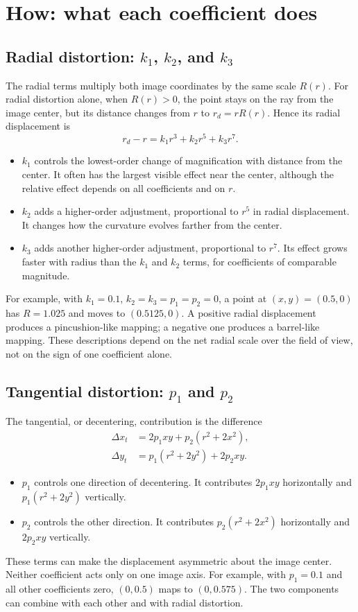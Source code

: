 \documentclass[11pt,a4paper]{article}
\begin{document}
\section{How: what each coefficient does}
\subsection{Radial distortion: $k_1$, $k_2$, and $k_3$}
The radial terms multiply both image coordinates by the same scale $R(r)$.
For radial distortion alone, when $R(r)>0$, the point stays on the ray from
the image center, but its distance changes from $r$ to $r_d=rR(r)$. Hence its
radial displacement is
\begin{equation}
  r_d-r=k_1r^3+k_2r^5+k_3r^7.
\end{equation}
\begin{itemize}
  \item $k_1$ controls the lowest-order change of magnification with distance
  from the center. It often has the largest visible effect near the center,
  although the relative effect depends on all coefficients and on $r$.
  \item $k_2$ adds a higher-order adjustment, proportional to $r^5$ in
  radial displacement. It changes how the curvature evolves farther from the
  center.
  \item $k_3$ adds another higher-order adjustment, proportional to $r^7$.
  Its effect grows faster with radius than the $k_1$ and $k_2$ terms, for
  coefficients of comparable magnitude.
\end{itemize}
For example, with $k_1=0.1$, $k_2=k_3=p_1=p_2=0$, a point at
$(x,y)=(0.5,0)$ has $R=1.025$ and moves to $(0.5125,0)$. A positive
radial displacement produces a pincushion-like mapping; a negative one
produces a barrel-like mapping. These descriptions depend on the net radial
scale over the field of view, not on the sign of one coefficient alone.

\subsection{Tangential distortion: $p_1$ and $p_2$}
The tangential, or decentering, contribution is the difference
\begin{align}
  \Delta x_t &= 2p_1xy+p_2(r^2+2x^2),\\
  \Delta y_t &= p_1(r^2+2y^2)+2p_2xy.
\end{align}
\begin{itemize}
  \item $p_1$ controls one direction of decentering. It contributes
  $2p_1xy$ horizontally and $p_1(r^2+2y^2)$ vertically.
  \item $p_2$ controls the other direction. It contributes
  $p_2(r^2+2x^2)$ horizontally and $2p_2xy$ vertically.
\end{itemize}
These terms can make the displacement asymmetric about the image center.
Neither coefficient acts only on one image axis. For example, with
$p_1=0.1$ and all other coefficients zero, $(0,0.5)$ maps to $(0,0.575)$.
The two components can combine with each other and with radial distortion.
\end{document}
